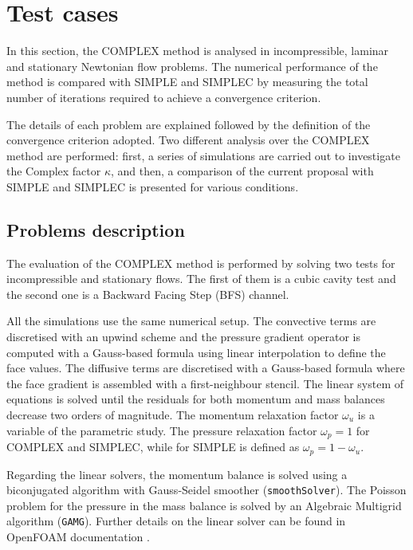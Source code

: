 \documentclass[final,3p,times,11pt,onecolumn]{myElsarticle}
\numberwithin{equation}{section}
\begin{document}
\section{Test cases}
\label{sec:cases}

In this section, the COMPLEX method is analysed in incompressible, laminar and stationary Newtonian flow problems. The numerical performance of the method is compared with SIMPLE and SIMPLEC by measuring the total number of iterations required to achieve a convergence criterion.

The details of each problem are explained followed by the definition of the convergence criterion adopted. Two different analysis over the COMPLEX method are performed: first, a series of simulations are carried out to investigate the Complex factor $\kappa$, and then, a comparison of the current proposal with SIMPLE and SIMPLEC is presented for various conditions. 

\subsection{Problems description}\label{Section:problemDescription}
 The evaluation of the COMPLEX method is performed by solving two tests for incompressible and stationary flows. The first of them is a cubic cavity test and the second one is a Backward Facing Step (BFS) channel.

All the simulations use the same numerical setup. The convective terms are discretised with an upwind scheme and the pressure gradient operator is computed with a Gauss-based formula using linear interpolation to define the face values. The diffusive terms are discretised with a Gauss-based formula where the face gradient is assembled with a first-neighbour stencil. The linear system of equations is solved until the residuals for both momentum and mass balances decrease two orders of magnitude. The momentum relaxation factor $\omega_u$ is a variable of the parametric study. The pressure relaxation factor $\omega_p = 1$ for COMPLEX and SIMPLEC, while for SIMPLE is defined as $\omega_p = 1 - \omega_u$.

Regarding the linear solvers, the momentum balance is solved using a biconjugated algorithm with Gauss-Seidel smoother (\texttt{smoothSolver}). The Poisson problem for the pressure in the mass balance is solved by an Algebraic Multigrid algorithm (\texttt{GAMG}). Further details on the linear solver can be found in OpenFOAM documentation \cite{greenshields2015openfoam}.
\end{document}
